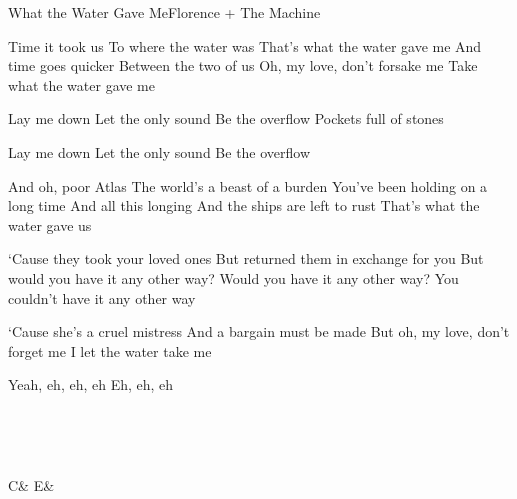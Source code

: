 \begin{Song}{What the Water Gave Me}{Florence + The Machine}
\begin{multicols}{2}
\begin{Verse}
Time it took us
To where the water was
That’s what the water gave me
And time goes quicker
Between the two of us
Oh, my love, don’t forsake me
Take what the water gave me
\end{Verse}
\espaceInterStrophe

\begin{Chorus}
Lay me down
Let the only sound
Be the overflow
Pockets full of stones
\espaceInterStrophe

Lay me down
Let the only sound
Be the overflow
\end{Chorus}
\espaceInterStrophe

\begin{Verse}
And oh, poor Atlas
The world’s a beast of a burden
You’ve been holding on a long time
And all this longing
And the ships are left to rust
That’s what the water gave us
\end{Verse}
\columnbreak

\tochorus
\espaceInterStrophe

\begin{Bridge}
‘Cause they took your loved ones
But returned them in exchange for you
But would you have it any other way?
Would you have it any other way?
You couldn't have it any other way
\espaceInterStrophe

‘Cause she’s a cruel mistress
And a bargain must be made
But oh, my love, don’t forget me
I let the water take me
\end{Bridge}
\espaceInterStrophe

\tochorus[Calm]
\espaceInterStrophe

\tochorus
\espaceInterStrophe

\begin{Chorus}
Yeah, eh, eh, eh
Eh, eh, eh
\adlib
\end{Chorus}
\vfill
~
\end{multicols}

\vfill

\begin{multicols}{2}

\gridGroupNormal\\

\begin{Chords}
\hline
C\mineur & E\bemol & \\\hline
\end{Chords}
\espaceInterGrille


\end{multicols}
\end{Song}
